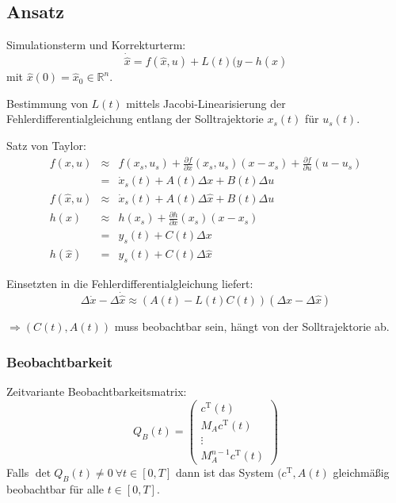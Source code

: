 \subsection{Ansatz}
Simulationsterm und Korrekturterm:
\begin{equation}
    \dot{\hat{x}} = f(\hat{x}, u) + L(t) (y- h(\hat{x}) 
\end{equation}
mit $\hat{x}(0) = \hat{x}_0 \in \mathbb{R}^n$.

Bestimmung von $L(t)$ mittels Jacobi-Linearisierung der Fehlerdifferentialgleichung 
entlang der Solltrajektorie $x_s(t)$ für $u_s(t)$.

Satz von Taylor:
\begin{eqnarray}
    f(x,u) &\approx& f(x_s, u_s) + \frac{\partial f}{\partial x}(x_s, u_s) (x -x_s)
                + \frac{\partial f}{\partial u}(u-u_s) \\
            &=& \dot{x}_s(t) + A(t) \Delta x + B(t) \Delta u \\
    f(\hat{x}, u) &\approx& \dot{x}_s(t) + A(t) \Delta \hat{x} + B(t) \Delta u \\
    h(x) &\approx& h(x_s) + \frac{\partial h}{\partial x}(x_s) (x-x_s) \\
            &=& y_s(t) + C(t) \Delta x \\
    h(\hat{x}) &=& y_s(t) + C(t) \Delta \hat{x}
\end{eqnarray}

Einsetzten in die Fehlerdifferentialgleichung liefert:
\begin{equation}
    \Delta \dot{x} - \Delta \dot{\hat{x}} \approx
        (A(t) - L(t) C(t)) (\Delta x - \Delta \hat{x})
\end{equation}

$\Rightarrow (C(t), A(t))$ muss beobachtbar sein, hängt von der Solltrajektorie ab.

\subsubsection{Beobachtbarkeit}
Zeitvariante Beobachtbarkeitsmatrix:
\begin{equation}
    Q_B(t) =
    \begin{pmatrix}
        c^\text{T}(t) \\ M_A c^\text{T}(t) \\ \vdots \\ M_A^{n-1} c^\text{T} (t)
    \end{pmatrix}
\end{equation}
Falls $\det Q_B(t) \neq 0\ \forall t \in [0, T]$ dann ist das System $(c^\text{T}, A(t)$
gleichmäßig beobachtbar für alle $t \in [0, T]$.

